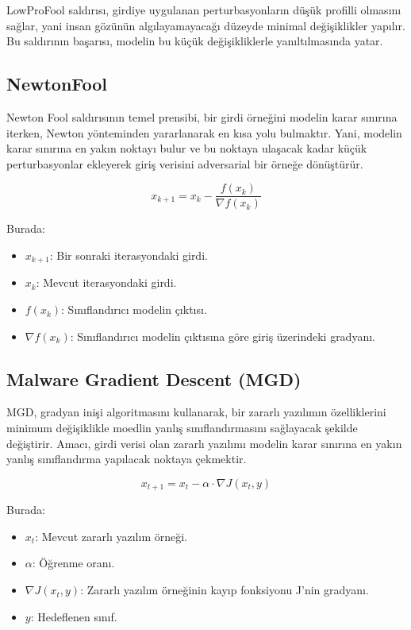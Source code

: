 LowProFool saldırısı, girdiye uygulanan perturbasyonların düşük profilli olmasını sağlar, yani insan gözünün algılayamayacağı düzeyde minimal değişiklikler yapılır. Bu saldırının başarısı, modelin bu küçük değişikliklerle yanıltılmasında yatar.

\newpage

\subsection{NewtonFool}

Newton Fool saldırısının temel prensibi, bir girdi örneğini modelin karar sınırına iterken, Newton yönteminden yararlanarak en kısa yolu bulmaktır. Yani, modelin karar sınırına en yakın noktayı bulur ve bu noktaya ulaşacak kadar küçük perturbasyonlar ekleyerek giriş verisini adversarial bir örneğe dönüştürür.

\[ x_{k+1} = x_k - \frac{f(x_k)}{\nabla f(x_k)} \]

Burada:

\begin{itemize}
    \item $x_{k+1}$: Bir sonraki iterasyondaki girdi.
    \item $x_k$: Mevcut iterasyondaki girdi.
    \item $f(x_k)$: Sınıflandırıcı modelin çıktısı.
    \item $\nabla f(x_k)$: Sınıflandırıcı modelin çıktısına göre giriş üzerindeki gradyanı.
\end{itemize}

\newpage

\subsection{Malware Gradient Descent (MGD)}

MGD, gradyan inişi algoritmasını kullanarak, bir zararlı yazılımın özelliklerini minimum değişiklikle moedlin yanlış sınıflandırmasını sağlayacak şekilde değiştirir. Amacı, girdi verisi olan zararlı yazılımı modelin karar sınırına en yakın yanlış sınıflandırma yapılacak noktaya çekmektir.

\[ x_{t+1} = x_t - \alpha \cdot \nabla J(x_t, y) \]

Burada:

\begin{itemize}
    \item $x_t$: Mevcut zararlı yazılım örneği.
    \item $\alpha$: Öğrenme oranı.
    \item $\nabla J(x_t, y)$: Zararlı yazılım örneğinin kayıp fonksiyonu J'nin gradyanı.
    \item $y$: Hedeflenen sınıf.
\end{itemize}


